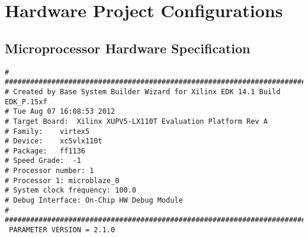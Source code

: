 \appendix 

\chapter{Hardware Project Configurations}

\section{Microprocessor Hardware Specification}

\begin{verbatim}
# ##############################################################################
# Created by Base System Builder Wizard for Xilinx EDK 14.1 Build EDK_P.15xf
# Tue Aug 07 16:08:53 2012
# Target Board:  Xilinx XUPV5-LX110T Evaluation Platform Rev A
# Family:    virtex5
# Device:    xc5vlx110t
# Package:   ff1136
# Speed Grade:  -1
# Processor number: 1
# Processor 1: microblaze_0
# System clock frequency: 100.0
# Debug Interface: On-Chip HW Debug Module
# ##############################################################################
 PARAMETER VERSION = 2.1.0



\end{verbatim}
